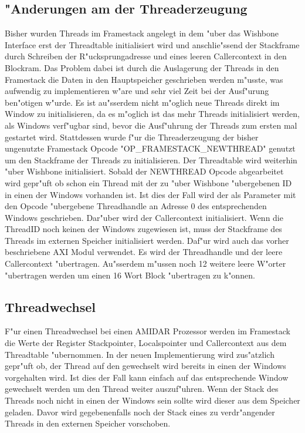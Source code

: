 \subsection{"Anderungen am der Threaderzeugung}
Bisher wurden Threads im Framestack angelegt in dem "uber das Wishbone Interface erst der Threadtable initialisiert wird und anschlie{"ss}end der Stackframe durch Schreiben der R"ucksprungadresse und eines leeren Callercontext in den Blockram. Das Problem dabei ist durch die Auslagerung der Threads in den Framestack die Daten in den Hauptspeicher geschrieben werden m"usste, was aufwendig zu implementieren w"are und sehr viel Zeit bei der Ausf"urung ben"otigen w"urde. Es ist au{"ss}erdem nicht m"oglich neue Threads direkt im Window zu initialisieren, da es m"oglich ist das mehr Threads initialisiert werden, als Windows verf"ugbar sind, bevor die Ausf"uhrung der Threads zum ersten mal gestartet wird. 
Stattdessen wurde f"ur die Threaderzeugung der bisher ungenutzte Framestack Opcode "OP\_FRAMESTACK\_NEWTHREAD" genutzt um den Stackframe der Threads zu initialisieren. Der Threadtable wird weiterhin "uber Wishbone initialisiert. Sobald der NEWTHREAD Opcode abgearbeitet wird gepr"uft ob schon ein Thread mit der zu "uber Wishbone "ubergebenen ID in einen der Windows vorhanden ist. Ist dies der Fall wird der als Parameter mit den Opcode "ubergebene Threadhandle an Adresse 0 des entsprechenden Windows geschrieben. Dar"uber wird der Callercontext initialisiert. Wenn die ThreadID noch keinen der Windows zugewiesen ist, muss der Stackframe des Threads im externen Speicher initialisiert werden. Daf"ur wird auch das vorher beschriebene AXI Modul verwendet. Es wird der Threadhandle und der leere Callercontext "ubertragen. Au{"ss}erdem m"ussen noch 12 weitere leere W"orter "ubertragen werden um einen 16 Wort Block "ubertragen zu k"onnen. 

\subsection{Threadwechsel}
F"ur einen Threadwechsel bei einen AMIDAR Prozessor werden im Framestack die Werte der Register Stackpointer, Localspointer und Callercontext aus dem Threadtable "ubernommen. In der neuen Implementierung wird zus"atzlich gepr"uft ob, der Thread auf den gewechselt wird bereits in einen der Windows vorgehalten wird. Ist dies der Fall kann einfach auf das entsprechende Window gewechselt werden um den Thread weiter auszuf"uhren. Wenn der Stack des Threads noch nicht in einen der Windows sein sollte wird dieser aus dem Speicher geladen. Davor wird gegebenenfalls noch der Stack eines zu verdr"angender Threads in den externen Speicher vorschoben. 
